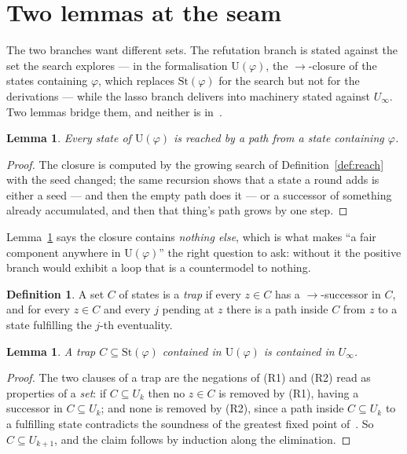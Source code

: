 \documentclass[11pt,a4paper]{article}
\newtheorem{lemma}[theorem]{Lemma}
\theoremstyle{definition}
\newtheorem{definition}[theorem]{Definition}
\newcommand{\St}{\mathrm{St}}
\newcommand{\Ust}{\mathrm{U}}
\begin{document}
\section{Two lemmas at the seam}\label{sec:seam}

The two branches want different sets.  The refutation branch is stated against
the set the search explores --- in the formalisation $\Ust(\varphi)$, the
$\to$-closure of the states containing $\varphi$, which replaces $\St(\varphi)$
for the search but not for the derivations --- while the lasso branch delivers
into machinery stated against $U_\infty$.  Two lemmas bridge them, and neither
is in~\cite{m4}.

\begin{lemma}\label{lem:seeded}
Every state of $\Ust(\varphi)$ is reached by a path from a state containing
$\varphi$.
\end{lemma}

\begin{proof}
The closure is computed by the growing search of Definition~\ref{def:reach}
with the seed changed; the same recursion shows that a state a round adds is
either a seed --- and then the empty path does it --- or a successor of
something already accumulated, and then that thing's path grows by one step.
\end{proof}

Lemma~\ref{lem:seeded} says the closure contains \emph{nothing else}, which is
what makes ``a fair component anywhere in $\Ust(\varphi)$'' the right question
to ask: without it the positive branch would exhibit a loop that is a
countermodel to nothing.

\begin{definition}
A set $C$ of states is a \emph{trap} if every $z\in C$ has a
$\to$-successor in $C$, and for every $z\in C$ and every $j$ pending at $z$
there is a path inside $C$ from $z$ to a state fulfilling the $j$-th
eventuality.
\end{definition}

\begin{lemma}\label{lem:trap}
A trap $C\subseteq\St(\varphi)$ contained in $\Ust(\varphi)$ is contained in
$U_\infty$.
\end{lemma}

\begin{proof}
The two clauses of a trap are the negations of (R1) and (R2) read as properties
of a \emph{set}: if $C\subseteq U_k$ then no $z\in C$ is removed by (R1),
having a successor in $C\subseteq U_k$; and none is removed by (R2), since a
path inside $C\subseteq U_k$ to a fulfilling state contradicts the soundness of
the greatest fixed point of~\cite[Rem.~3.2]{m4}.  So $C\subseteq U_{k+1}$, and
the claim follows by induction along the elimination.
\end{proof}
\end{document}
